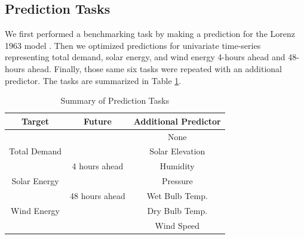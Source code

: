  \subsection{Prediction Tasks}

We first performed a benchmarking task by making a prediction for the Lorenz
1963 model \cite{lorenz_deterministic_1963}. Then we optimized predictions for
univariate time-series
representing total demand, solar energy, and wind energy 4-hours ahead and
48-hours ahead. Finally, those same six tasks were repeated with an additional
predictor. The tasks are summarized in Table \ref{tab:tasks}.

\begin{table}[h]
  \centering
  \caption{Summary of Prediction Tasks}
  \label{tab:tasks}
  \begin{tabular}{c|c|c}
    \hline
    Target & Future & Additional Predictor\\
    \hline
    && None \\
    Total Demand && Solar Elevation\\
    &4 hours ahead& Humidity\\
    Solar Energy && Pressure\\
    &48 hours ahead& Wet Bulb Temp.\\
    Wind Energy && Dry Bulb Temp.\\
    && Wind Speed\\
  \end{tabular}\\[-1.4pt]%

\end{table}
